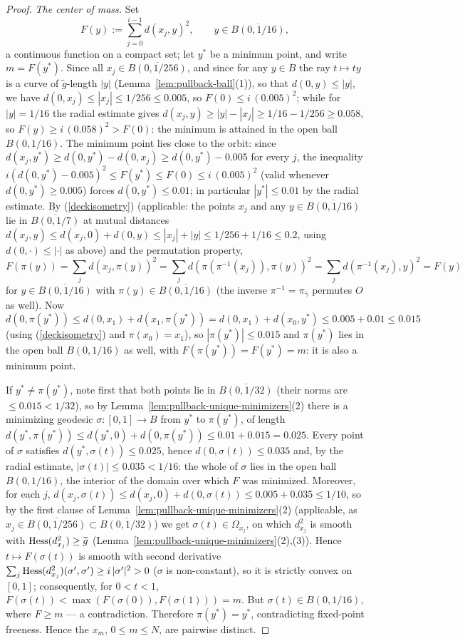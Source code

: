 \begin{proof}
\emph{The center of mass.} Set
$$F(y):=\sum_{j=0}^{i-1}d\left(x_j,y\right)^2,
\qquad y\in\overline{B(0,1/16)},$$
a continuous function on a compact set; let $y^*$ be a minimum
point, and write $m=F(y^*)$. Since all
$x_j\in\overline{B(0,1/256)}$, and since for any $y\in B$ the ray
$t\mapsto ty$ is a curve of $\tilde g$-length $|y|$
(Lemma~\ref{lem:pullback-ball}(1)), so that $d(0,y)\le|y|$, we
have $d(0,x_j)\le|x_j|\le1/256\le0.005$, so $F(0)\le
i\,(0.005)^2$; while for $|y|=1/16$ the radial estimate gives
$d(x_j,y)\ge|y|-|x_j|\ge1/16-1/256\ge 0.058$, so
$F(y)\ge i\,(0.058)^2>F(0)$: the minimum is attained in the open
ball $B(0,1/16)$. The minimum point lies close to the orbit: since
$d(x_j,y^*)\ge d(0,y^*)-d(0,x_j)\ge d(0,y^*)-0.005$ for every
$j$, the inequality
$i\left(d(0,y^*)-0.005\right)^2\le F(y^*)\le F(0)\le
i\,(0.005)^2$ (valid whenever $d(0,y^*)\ge0.005$) forces
$d(0,y^*)\le0.01$; in particular $|y^*|\le0.01$ by the radial
estimate. By (\ref{deckisometry}) (applicable: the points
$x_{j}$ and any $y\in\overline{B(0,1/16)}$ lie in
$\overline{B(0,1/7)}$ at mutual distances
$d(x_j,y)\le d(x_j,0)+d(0,y)\le|x_j|+|y|
\le1/256+1/16\le0.2$, using $d(0,\cdot)\le|\cdot|$ as above) and
the permutation property,
$$F(\pi(y))=\sum_jd\left(x_j,\pi(y)\right)^2
=\sum_jd\left(\pi\left(\pi^{-1}(x_j)\right),\pi(y)\right)^2
=\sum_jd\left(\pi^{-1}(x_j),y\right)^2=F(y)$$
for $y\in\overline{B(0,1/16)}$ with $\pi(y)\in
\overline{B(0,1/16)}$ (the inverse $\pi^{-1}=\pi_{\bar\gamma}$
permutes $O$ as well). Now
$d(0,\pi(y^*))\le d(0,x_1)+d(x_1,\pi(y^*))
=d(0,x_1)+d(x_0,y^*)\le0.005+0.01\le0.015$ (using
(\ref{deckisometry}) and $\pi(x_0)=x_1$), so
$|\pi(y^*)|\le0.015$ and $\pi(y^*)$ lies in the open ball
$B(0,1/16)$ as well, with $F(\pi(y^*))=F(y^*)=m$: it is also a
minimum point.

If $y^*\not=\pi(y^*)$, note first that both points lie in
$\overline{B(0,1/32)}$ (their norms are $\le0.015<1/32$), so by
Lemma~\ref{lem:pullback-unique-minimizers}(2) there is a
minimizing geodesic $\sigma\colon[0,1]\to B$ from $y^*$ to
$\pi(y^*)$, of length $d(y^*,\pi(y^*))\le
d(y^*,0)+d(0,\pi(y^*))\le0.01+0.015=0.025$. Every point of
$\sigma$ satisfies $d(y^*,\sigma(t))\le0.025$, hence
$d(0,\sigma(t))\le0.035$ and, by the radial estimate,
$|\sigma(t)|\le0.035<1/16$: the whole of $\sigma$ lies in the open
ball $B(0,1/16)$, the interior of the domain over which $F$ was
minimized. Moreover, for each $j$,
$d\left(x_j,\sigma(t)\right)\le d(x_j,0)+d(0,\sigma(t))
\le0.005+0.035\le1/10$, so by the first clause of
Lemma~\ref{lem:pullback-unique-minimizers}(2) (applicable, as
$x_j\in\overline{B(0,1/256)}\subset\overline{B(0,1/32)}$) we get
$\sigma(t)\in\Omega_{x_j}$, on which $d_{x_j}^2$ is smooth with
$\operatorname{Hess}(d_{x_j}^2)\ge\widetilde g$
(Lemma~\ref{lem:pullback-unique-minimizers}(2),(3)). Hence $t\mapsto
F(\sigma(t))$ is smooth with second derivative
$\sum_j\operatorname{Hess}(d_{x_j}^2)(\sigma',\sigma')\ge
i\,|\sigma'|^2>0$ ($\sigma$ is non-constant), so it is strictly
convex on $[0,1]$; consequently, for $0<t<1$,
$F(\sigma(t))<\max\left(F(\sigma(0)),F(\sigma(1))\right)=m$. But
$\sigma(t)\in B(0,1/16)$, where $F\ge m$ --- a contradiction.
Therefore $\pi(y^*)=y^*$, contradicting fixed-point freeness.
Hence the $x_m$, $0\le m\le N$, are pairwise distinct.
\end{proof}

